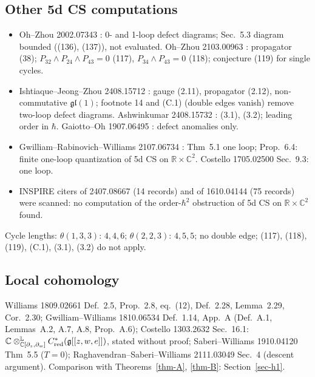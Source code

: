 \documentclass[10pt,a4paper]{article}
\numberwithin{equation}{section}
\theoremstyle{definition}
\theoremstyle{remark}
\newcommand{\g}{\mathfrak g}
\newcommand{\fgl}{\mathfrak{gl}}
\begin{document}
\subsection{Other 5d CS computations}
\begin{itemize}\itemsep1pt
\item Oh--Zhou 2002.07343 \cite{OZ1}: 0- and 1-loop defect diagrams; Sec.~5.3 diagram bounded ((136), (137)), not evaluated. Oh--Zhou 2103.00963 \cite{OZ2}: propagator (38); $P_{32}\wedge P_{24}\wedge P_{43}=0$ (117), $P_{34}\wedge P_{43}=0$ (118); conjecture (119) for single cycles.
\item Ishtiaque--Jeong--Zhou 2408.15712 \cite{IJZ}: gauge (2.11), propagator (2.12), non-commutative $\fgl(1)$; footnote 14 and (C.1) (double edges vanish) remove two-loop defect diagrams. Ashwinkumar 2408.15732 \cite{Ash}: (3.1), (3.2); leading order in $\hbar$. Gaiotto--Oh 1907.06495 \cite{GO}: defect anomalies only.
\item Gwilliam--Rabinovich--Williams 2107.06734 \cite{GRW}: Thm~5.1 one loop; Prop.~6.4: finite one-loop quantization of 5d CS on $\mathbb R\times\mathbb C^2$. Costello 1705.02500 \cite{C17} Sec.~9.3: one loop.
\item INSPIRE citers of 2407.08667 (14 records) and of 1610.04144 (75 records) were scanned: no computation of the order-$\hbar^2$ obstruction of 5d CS on $\mathbb R\times\mathbb C^2$ found.
\end{itemize}
Cycle lengths: $\theta(1,3,3)$: $4,4,6$; $\theta(2,2,3)$: $4,5,5$; no double edge; (117), (118), (119), (C.1), (3.1), (3.2) do not apply.

\subsection{Local cohomology}
Williams 1809.02661 \cite{Wil} Def.~2.5, Prop.~2.8, eq.~(12), Def.~2.28, Lemma~2.29, Cor.~2.30; Gwilliam--Williams 1810.06534 \cite{GW18} Def.~1.14, App.~A (Def.~A.1, Lemmas~A.2, A.7, A.8, Prop.~A.6); Costello 1303.2632 \cite{C13} Sec.~16.1: $\mathbb C\otimes^{\mathbb L}_{\mathbb C[\partial_z,\partial_w]}C^*_{\rm red}(\g[[z,w,e]])$, stated without proof; Saberi--Williams 1910.04120 \cite{SW} Thm~5.5 ($T=0$); Raghavendran--Saberi--Williams 2111.03049 \cite{RSW} Sec.~4 (descent argument). Comparison with Theorems~\ref{thm-A}, \ref{thm-B}: Section~\ref{sec-h1}.
\end{document}
